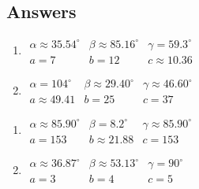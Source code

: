 \newpage

\subsection{Answers}

\begin{multicols}{2}

\begin{enumerate}

\item $\begin{array}{lll}
\alpha \approx 35.54^{\circ} & \beta \approx 85.16^{\circ} & \gamma = 59.3^{\circ} \\
a = 7 & b = 12 & c \approx 10.36 \end{array}$

\item $\begin{array}{lll}
\alpha = 104^{\circ} & \beta \approx 29.40^{\circ} & \gamma \approx 46.60^{\circ} \\
a \approx 49.41 & b = 25 & c = 37 \end{array}$

\setcounter{HW}{\value{enumi}}

\end{enumerate}

\end{multicols}

\begin{multicols}{2} 

\begin{enumerate}

\setcounter{enumi}{\value{HW}}

\item $\begin{array}{lll}
\alpha \approx 85.90^{\circ} & \beta = 8.2^{\circ} & \gamma \approx 85.90^{\circ} \\
a = 153 & b \approx 21.88 & c = 153 \end{array}$

\item $\begin{array}{lll}
\alpha \approx 36.87^{\circ} & \beta \approx 53.13^{\circ} & \gamma = 90^{\circ} \\
a = 3 & b = 4 & c = 5 \end{array}$

\setcounter{HW}{\value{enumi}}

\end{enumerate}

\end{multicols}

